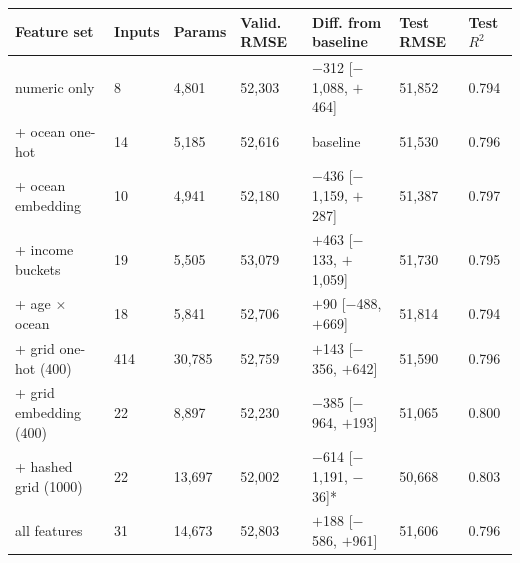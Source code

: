 \begin{tabular}{L{3.9cm}R{1.0cm}R{1.2cm}R{1.3cm}L{4.0cm}R{1.3cm}R{1.0cm}}
\toprule
Feature set & Inputs & Params & Valid. RMSE & Diff. from baseline\newline [95\% interval] & Test RMSE & Test $R^2$ \\
\midrule
numeric only & 8 & 4,801 & 52,303 & $-$312 [$-$1,088, $+$464] & 51,852 & 0.794 \\
+ ocean one-hot & 14 & 5,185 & 52,616 & baseline & 51,530 & 0.796 \\
+ ocean embedding & 10 & 4,941 & 52,180 & $-$436 [$-$1,159, $+$287] & 51,387 & 0.797 \\
+ income buckets & 19 & 5,505 & 53,079 & $+$463 [$-$133, $+$1,059] & 51,730 & 0.795 \\
+ age $\times$ ocean & 18 & 5,841 & 52,706 & $+$90 [$-$488, $+$669] & 51,814 & 0.794 \\
+ grid one-hot (400) & 414 & 30,785 & 52,759 & $+$143 [$-$356, $+$642] & 51,590 & 0.796 \\
+ grid embedding (400) & 22 & 8,897 & 52,230 & $-$385 [$-$964, $+$193] & 51,065 & 0.800 \\
+ hashed grid (1000) & 22 & 13,697 & 52,002 & $-$614 [$-$1,191, $-$36]* & 50,668 & 0.803 \\
all features & 31 & 14,673 & 52,803 & $+$188 [$-$586, $+$961] & 51,606 & 0.796 \\
\bottomrule
\end{tabular}
